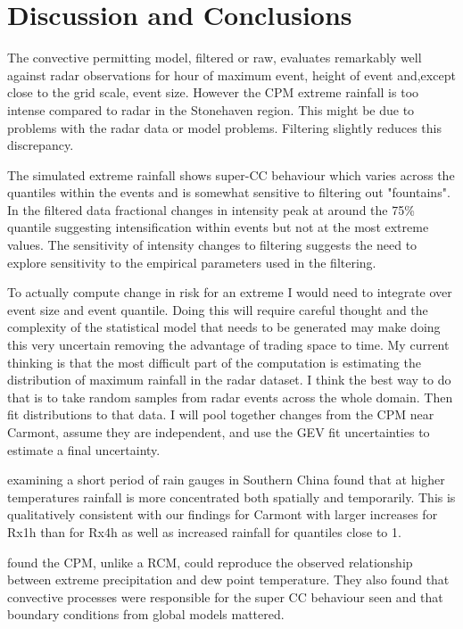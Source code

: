 \documentclass[11pt,a4paper]{article}
\begin{document}
\section{Discussion and Conclusions}
The convective permitting model, filtered or raw, evaluates remarkably well against radar observations for hour of maximum event, height of event and,except close to the grid scale, event size. However the CPM extreme rainfall is too intense compared to radar in the Stonehaven region. This might be due to problems with the radar data or model problems.  Filtering slightly reduces this discrepancy. 

The simulated extreme rainfall shows super-CC behaviour  which varies across the quantiles within the events and is somewhat sensitive to filtering out "fountains". In the filtered data fractional changes in intensity peak at around the 75\% quantile suggesting intensification within events but not at the most extreme values. The sensitivity of intensity changes to filtering suggests the need to explore sensitivity to the empirical parameters used in the filtering.
 
 
 To actually  compute change in risk for an extreme I would need to integrate over event size and event quantile. Doing this will require careful thought and the complexity of the statistical model  that needs to be generated may make doing this very uncertain removing the advantage of trading space to time.  My current thinking is that the most difficult part of the computation is estimating the distribution of maximum rainfall in the radar dataset. I think the best way to do that is to take random samples from radar events across the whole domain. Then fit distributions to that data.  I will pool together changes from the CPM near Carmont, assume they are independent, and use the GEV fit  uncertainties to estimate a final uncertainty. 

   \cite{long2021rainfall_conc} examining a short period of rain gauges in Southern China found that at higher temperatures rainfall is more concentrated both spatially and temporarily. This is qualitatively consistent with our findings for Carmont with larger increases for Rx1h than for Rx4h as well as increased rainfall for quantiles close to 1.

\cite{Lee2022CPM_Korea} found the CPM, unlike a RCM, could reproduce the observed relationship between extreme precipitation and dew point temperature. They also found that convective processes were responsible for the super CC behaviour seen and that boundary conditions from global models mattered. 
\end{document}
